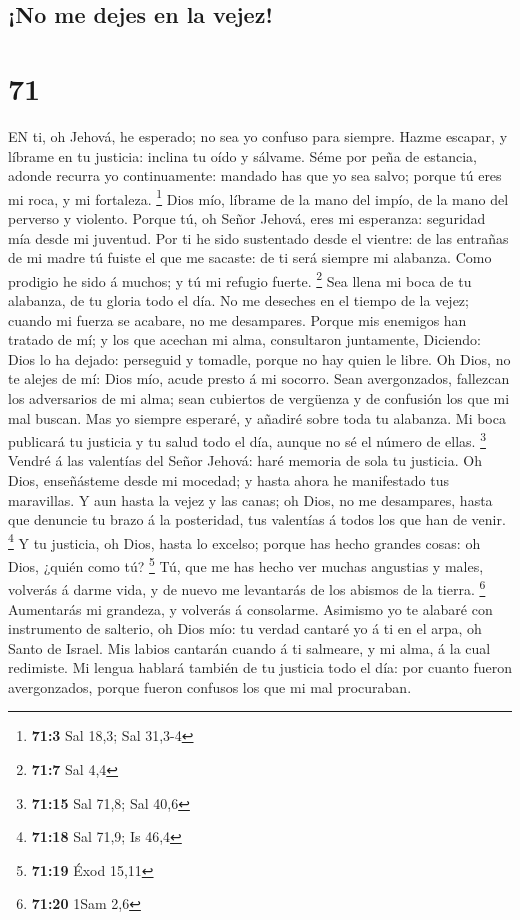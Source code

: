 \hypertarget{no-me-dejes-en-la-vejez}{%
\subsection{¡No me dejes en la vejez!}\label{no-me-dejes-en-la-vejez}}

\hypertarget{section-70}{%
\section{71}\label{section-70}}

 EN ti, oh Jehová, he esperado; no sea yo confuso para
siempre.  Hazme escapar, y líbrame en tu justicia: inclina
tu oído y sálvame.  Séme por peña de estancia, adonde
recurra yo continuamente: mandado has que yo sea salvo; porque tú eres
mi roca, y mi fortaleza. \footnote{\textbf{71:3} Sal 18,3; Sal 31,3-4}
 Dios mío, líbrame de la mano del impío, de la mano del
perverso y violento.  Porque tú, oh Señor Jehová, eres mi
esperanza: seguridad mía desde mi juventud.  Por ti he sido
sustentado desde el vientre: de las entrañas de mi madre tú fuiste el
que me sacaste: de ti será siempre mi alabanza.  Como
prodigio he sido á muchos; y tú mi refugio fuerte. \footnote{\textbf{71:7}
  Sal 4,4}  Sea llena mi boca de tu alabanza, de tu gloria
todo el día.  No me deseches en el tiempo de la vejez;
cuando mi fuerza se acabare, no me desampares.  Porque mis
enemigos han tratado de mí; y los que acechan mi alma, consultaron
juntamente,  Diciendo: Dios lo ha dejado: perseguid y
tomadle, porque no hay quien le libre.  Oh Dios, no te
alejes de mí: Dios mío, acude presto á mi socorro.  Sean
avergonzados, fallezcan los adversarios de mi alma; sean cubiertos de
vergüenza y de confusión los que mi mal buscan.  Mas yo
siempre esperaré, y añadiré sobre toda tu alabanza.  Mi
boca publicará tu justicia y tu salud todo el día, aunque no sé el
número de ellas. \footnote{\textbf{71:15} Sal 71,8; Sal 40,6}
 Vendré á las valentías del Señor Jehová: haré memoria de
sola tu justicia.  Oh Dios, enseñásteme desde mi mocedad; y
hasta ahora he manifestado tus maravillas.  Y aun hasta la
vejez y las canas; oh Dios, no me desampares, hasta que denuncie tu
brazo á la posteridad, tus valentías á todos los que han de venir.
\footnote{\textbf{71:18} Sal 71,9; Is 46,4}  Y tu justicia,
oh Dios, hasta lo excelso; porque has hecho grandes cosas: oh Dios,
¿quién como tú? \footnote{\textbf{71:19} Éxod 15,11}  Tú,
que me has hecho ver muchas angustias y males, volverás á darme vida, y
de nuevo me levantarás de los abismos de la tierra. \footnote{\textbf{71:20}
  1Sam 2,6}  Aumentarás mi grandeza, y volverás á
consolarme.  Asimismo yo te alabaré con instrumento de
salterio, oh Dios mío: tu verdad cantaré yo á ti en el arpa, oh Santo de
Israel.  Mis labios cantarán cuando á ti salmeare, y mi
alma, á la cual redimiste.  Mi lengua hablará también de tu
justicia todo el día: por cuanto fueron avergonzados, porque fueron
confusos los que mi mal procuraban.


